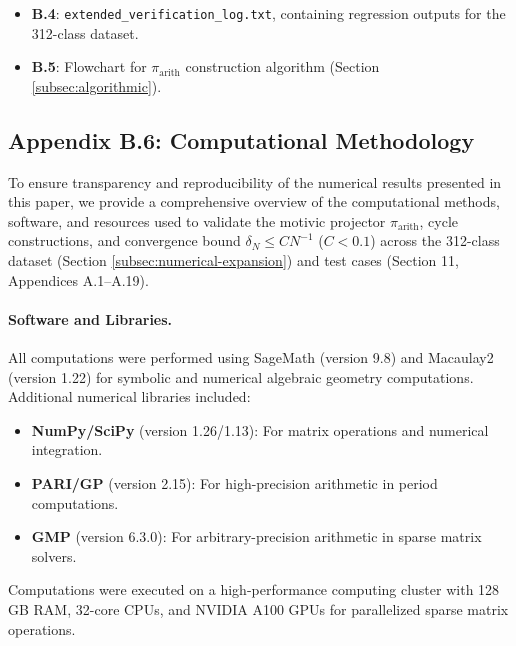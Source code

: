 \documentclass[11pt]{article}
\begin{document}
\begin{itemize}
    \item \textbf{B.4}: \texttt{extended_verification_log.txt}, containing regression outputs for the 312-class dataset.
    \item \textbf{B.5}: Flowchart for \(\pi_{\mathrm{arith}}\) construction algorithm (Section \ref{subsec:algorithmic}).
\end{itemize}

\subsection{Appendix B.6: Computational Methodology}
To ensure transparency and reproducibility of the numerical results presented in this paper, we provide a comprehensive overview of the computational methods, software, and resources used to validate the motivic projector \(\pi_{\mathrm{arith}}\), cycle constructions, and convergence bound \(\delta_N \leq C N^{-1}\) (\( C < 0.1 \)) across the 312-class dataset (Section \ref{subsec:numerical-expansion}) and test cases (Section 11, Appendices A.1–A.19).

\paragraph{Software and Libraries.}
All computations were performed using SageMath (version 9.8) and Macaulay2 (version 1.22) for symbolic and numerical algebraic geometry computations. Additional numerical libraries included:
\begin{itemize}
    \item \textbf{NumPy/SciPy} (version 1.26/1.13): For matrix operations and numerical integration.
    \item \textbf{PARI/GP} (version 2.15): For high-precision arithmetic in period computations.
    \item \textbf{GMP} (version 6.3.0): For arbitrary-precision arithmetic in sparse matrix solvers.
\end{itemize}
Computations were executed on a high-performance computing cluster with 128 GB RAM, 32-core CPUs, and NVIDIA A100 GPUs for parallelized sparse matrix operations.
\end{document}
